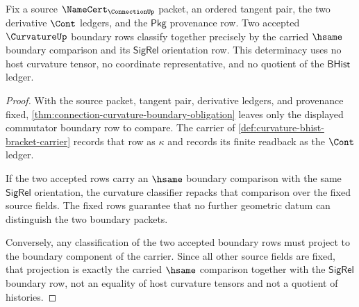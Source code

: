\begin{theorem}
\label{thm:curvature-boundary-row-determinacy}
Fix a source $\NameCert_{\ConnectionUp}$ packet, an ordered tangent pair, the two derivative $\Cont$ ledgers, and the $\mathsf{Pkg}$ provenance row. Two accepted $\CurvatureUp$ boundary rows classify together precisely by the carried $\hsame$ boundary comparison and its $\mathsf{SigRel}$ orientation row. This determinacy uses no host curvature tensor, no coordinate representative, and no quotient of the $\mathsf{BHist}$ ledger.
\end{theorem}
\begin{proof}
With the source packet, tangent pair, derivative ledgers, and provenance fixed, \autoref{thm:connection-curvature-boundary-obligation} leaves only the displayed commutator boundary row to compare. The carrier of \autoref{def:curvature-bhist-bracket-carrier} records that row as $\kappa$ and records its finite readback as the $\Cont$ ledger.

If the two accepted rows carry an $\hsame$ boundary comparison with the same $\mathsf{SigRel}$ orientation, the curvature classifier repacks that comparison over the fixed source fields. The fixed rows guarantee that no further geometric datum can distinguish the two boundary packets.

Conversely, any classification of the two accepted boundary rows must project to the boundary component of the carrier. Since all other source fields are fixed, that projection is exactly the carried $\hsame$ comparison together with the $\mathsf{SigRel}$ boundary row, not an equality of host curvature tensors and not a quotient of histories.
\end{proof}

